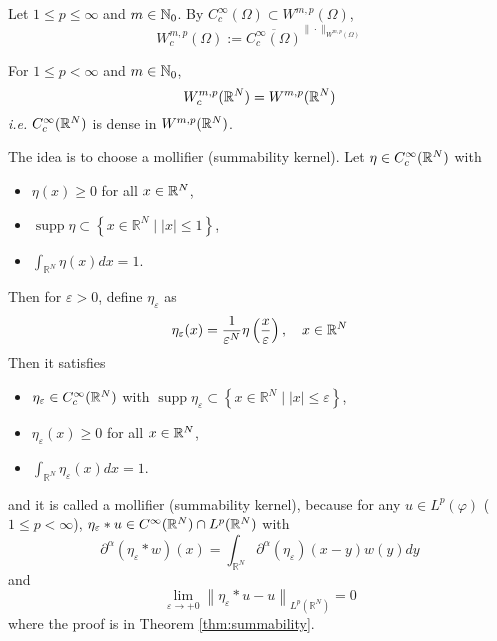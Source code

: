 \noindent Let $1 \leq p \leq \infty$ and $m \in \mathbb{N}_0$. By $C_c^{\infty}(\Omega) \subset W^{m, p}(\Omega)$,
\begin{equation*}
	W_c^{m, p}(\Omega):={\overline{C_c^{\infty}(\Omega)}}^{\|\cdot\|_{W^{m, p}(\Omega)}}
\end{equation*}

\begin{thm}\label{thm:cdenseinsob}
	For $1 \leq p < \infty$ and $m \in \mathbb{N}_0$,
	\begin{equation*}
		W_c^{m, p}(\mathbb{R}^N) = W^{m, p}(\mathbb{R}^N)
	\end{equation*}
	\emph{i.e.} $C_c^{\infty}(\mathbb{R}^N)$ is dense in $W^{m, p}(\mathbb{R}^N)$.
\end{thm}

\noindent The idea is to choose a mollifier (summability kernel). Let $\eta \in C_c^\infty(\mathbb{R}^N)$ with 
\begin{itemize}
	\item $\eta(x) \geq 0$ for all $x \in \mathbb{R}^N$,
	\item $\operatorname{supp} \eta \subset\left\{x \in \mathbb{R}^N \mid | x | \leq 1\right\}$,
	\item $\int_{\mathbb{R}^N} \eta(x) d x=1$.
\end{itemize}
Then for $\varepsilon > 0$, define $\eta_{\varepsilon}$ as
\begin{equation*}
	\eta_{\varepsilon}(x)=\frac{1}{\varepsilon^N} \eta\left(\frac{x}{\varepsilon}\right),\quad x \in \mathbb{R}^N
\end{equation*}
Then it satisfies
\begin{itemize}
	\item $\eta_\varepsilon \in C^\infty_c(\mathbb{R}^N)$ with $\operatorname{supp} \eta_{\varepsilon} \subset\left\{x \in \mathbb{R}^N \mid | x | \leq \varepsilon\right\}$,
	\item $\eta_\varepsilon(x) \geq 0$ for all $x \in \mathbb{R}^N$,
	\item $\int_{\mathbb{R}^N} \eta_{\varepsilon}(x) d x=1$.
\end{itemize}
and it is called a mollifier (summability kernel), because for any $u \in L^p(\varphi)$ ($1 \leq p < \infty$), $\eta_\varepsilon * u \in C^\infty(\mathbb{R}^N) \cap L^p(\mathbb{R}^N)$ with 
\begin{equation*}
	\partial^\alpha\left(\eta_{\varepsilon} * w\right)(x)=\int_{\mathbb{R}^N} \partial^\alpha(\eta_{\varepsilon})(x-y) w(y) d y
\end{equation*}
and 
\begin{equation*}
	\lim _{\varepsilon \rightarrow+0}\left\|\eta_{\varepsilon} * u-u\right\|_{L^p\left(\mathbb{R}^N\right)}=0
\end{equation*}
where the proof is in Theorem \ref{thm:summability}.

